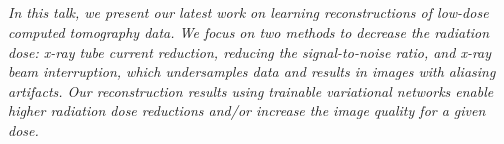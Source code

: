 \begin{multicols}{2}
\\ 
        \\
        \\\\
        \\
        \\\\
        \\
        \\\\
        \\
        \\\\
\\
      \textit{In this talk, we present our latest work on learning reconstructions of low-dose computed tomography data.
We focus on two methods to decrease the radiation dose: x-ray tube current reduction, reducing the signal-to-noise ratio, and x-ray beam interruption, which undersamples data and results in images with aliasing artifacts. 
Our reconstruction results using trainable variational networks enable higher radiation dose reductions and/or increase the image quality for a given dose.}\\
\\ 
        \\
        \\\\
        \\
        \\\\
        \\
        \\\\
        \\
        \\\\
        \\
        \\\\
        \\
        \\\\

\end{multicols}
